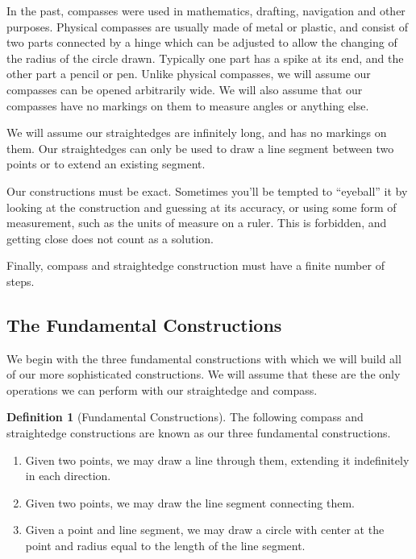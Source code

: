 \documentclass[11pt]{article}
\theoremstyle{definition}
\newtheorem{definition}[theorem]{Definition}
\begin{document}
In the past, compasses were used in mathematics, drafting, navigation and other purposes. Physical compasses are usually made of metal or 
plastic, and consist of two parts connected by a hinge which can be adjusted to allow the changing of the radius of the circle drawn. Typically 
one part has a spike at its end, and the other part a pencil or pen. Unlike physical compasses, we will assume our compasses can be opened arbitrarily 
wide. We will also assume that our compasses have no markings on them to measure angles or anything else. 

We will assume our straightedges are infinitely long, and has no markings on them. Our straightedges can only be used to draw a line segment between 
two points or to extend an existing segment.  

Our constructions must be exact. Sometimes you'll be tempted to ``eyeball'' it by looking at the construction and guessing at its accuracy, 
or using some form of measurement, such as the units of measure on a ruler. This is forbidden, and getting close does not count as a solution.

Finally, compass and straightedge construction must have a finite number of steps.

\subsection{The Fundamental Constructions}

We begin with the three fundamental constructions with which we will build all of our more sophisticated constructions. We will assume that these
are the only operations we can perform with our straightedge and compass.

\begin{definition}[Fundamental Constructions] The following compass and straightedge constructions are known as our three fundamental constructions.
  \begin{enumerate}
    \item Given two points, we may draw a line through them, extending it indefinitely in each direction.
    \item Given two points, we may draw the line segment connecting them.
    \item Given a point and line segment, we may draw a circle with center at the point and radius equal to the length of the line segment.
  \end{enumerate}
\end{definition}
\end{document}
